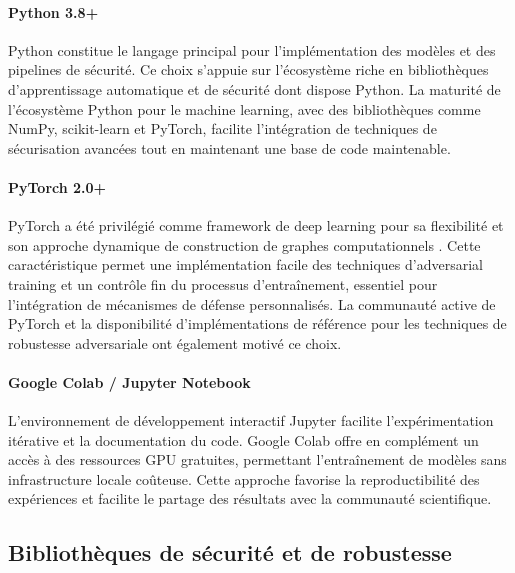 \paragraph{Python 3.8+}
Python constitue le langage principal pour l'implémentation des modèles et des pipelines de sécurité. Ce choix s'appuie sur l'écosystème riche en bibliothèques d'apprentissage automatique et de sécurité dont dispose Python. La maturité de l'écosystème Python pour le machine learning, avec des bibliothèques comme NumPy, scikit-learn et PyTorch, facilite l'intégration de techniques de sécurisation avancées tout en maintenant une base de code maintenable.

\paragraph{PyTorch 2.0+}
PyTorch a été privilégié comme framework de deep learning pour sa flexibilité et son approche dynamique de construction de graphes computationnels \cite{paszke2019pytorch}. Cette caractéristique permet une implémentation facile des techniques d'adversarial training et un contrôle fin du processus d'entraînement, essentiel pour l'intégration de mécanismes de défense personnalisés. La communauté active de PyTorch et la disponibilité d'implémentations de référence pour les techniques de robustesse adversariale ont également motivé ce choix.

\paragraph{Google Colab / Jupyter Notebook}
L'environnement de développement interactif Jupyter facilite l'expérimentation itérative et la documentation du code. Google Colab offre en complément un accès à des ressources GPU gratuites, permettant l'entraînement de modèles sans infrastructure locale coûteuse. Cette approche favorise la reproductibilité des expériences et facilite le partage des résultats avec la communauté scientifique.

\subsection{Bibliothèques de sécurité et de robustesse}

